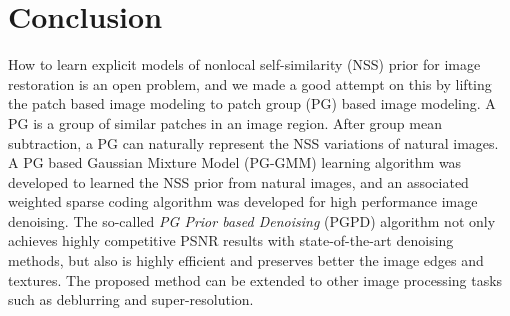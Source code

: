 



\section{Conclusion}
How to learn explicit models of nonlocal self-similarity (NSS) prior for image restoration is an open problem, and we made a good attempt on this by lifting the patch based image modeling to patch group (PG) based image modeling. A PG is a group of similar patches in an image region. After group mean subtraction, a PG can naturally represent the NSS variations of natural images. A PG based Gaussian Mixture Model (PG-GMM) learning algorithm was developed to learned the NSS prior from natural images, and an associated weighted sparse coding algorithm was developed for high performance image denoising. The so-called \textsl{PG Prior based Denoising} (PGPD) algorithm not only achieves highly competitive PSNR results with state-of-the-art denoising methods, but also is highly efficient and preserves better the image edges and textures. The proposed method can be extended to other image processing tasks such as deblurring and super-resolution.
